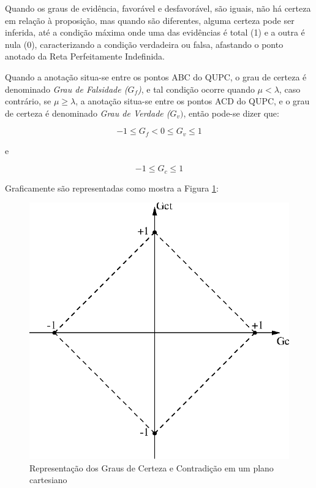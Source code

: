 Quando os graus de evidência, favorável e desfavorável, são iguais, não há certeza em relação à proposição, mas quando são diferentes, alguma certeza pode ser inferida, até a condição máxima onde uma das evidências é total (1) e a outra é nula (0), caracterizando a condição verdadeira ou falsa, afastando o ponto anotado da Reta Perfeitamente Indefinida. 

Quando a anotação situa-se entre os pontos ABC do QUPC, o grau de certeza é denominado \emph{Grau de Falsidade ($G _f$)}, e tal condição ocorre quando $\mu < \lambda $, caso contrário, se $\mu \ge \lambda $, a anotação situa-se entre os pontos ACD do QUPC, e o grau de certeza é denominado \emph{Grau de Verdade ($G _v)$}, então pode-se dizer que:
\begin{center}
\begin{equation}
-1 \le G _{f}  <  0 \le G _{v} \le 1
\label{eq:grauVerdadeFalsidade}
\end{equation}
\end{center}
e
\begin{center}
\begin{equation}
-1 \le G _{c} \le 1
\label{eq:grauCertezaIntervalo}
\end{equation}
\end{center}

Graficamente são representadas como mostra a Figura \ref{fig:retasgcgct}:

\begin{figure}[!htb]
\center\includegraphics[scale=1.0]{./pic/C428retasgcgct.eps}
\caption{Representação dos Graus de Certeza e Contradição em um plano cartesiano}
\label{fig:retasgcgct}
\end{figure}

